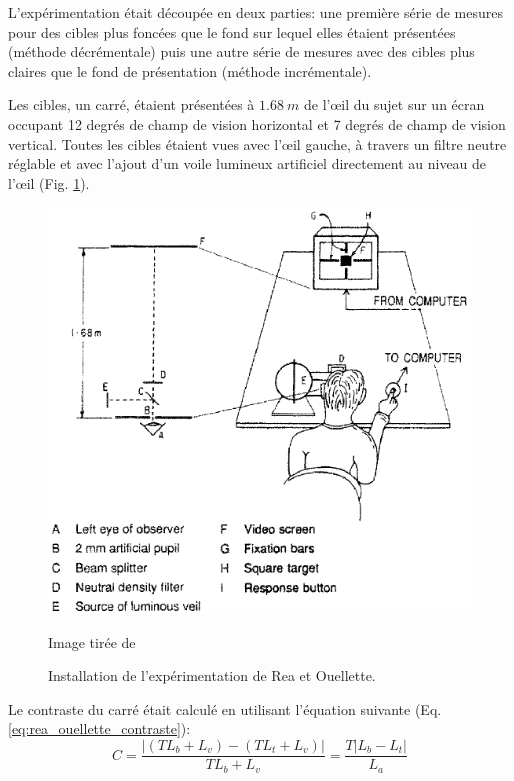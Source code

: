 	\par L'expérimentation était découpée en deux parties: une première série de mesures pour des cibles plus foncées que le fond sur lequel elles étaient présentées (méthode décrémentale) puis une autre série de mesures avec des cibles plus claires que le fond de présentation (méthode incrémentale).
	
	\par Les cibles, un carré, étaient présentées à $1.68~m$ de l'œil du sujet sur un écran occupant 12 degrés de champ de vision horizontal et 7 degrés de champ de vision vertical. Toutes les cibles étaient vues avec l'œil gauche, à travers un filtre neutre réglable et avec l'ajout d'un voile lumineux artificiel directement au niveau de l'œil (Fig. \ref{fig:rea_apparatus}).
	
	\begin{figure}[h]
		\centering
		\includegraphics[scale=.75]{Figures/ReactionTimeApparatus}
		\caption{Installation de l'expérimentation de Rea et Ouellette.}{Image tirée de \citep{rea_visual_1988}}
		\label{fig:rea_apparatus}
	\end{figure}
	
	\par Le contraste du carré était calculé en utilisant l'équation suivante (Eq. \ref{eq:rea_ouellette_contraste}):
	 \begin{equation}
		C = \frac{\vert (T L_b + L_v) - (T L_t + L_v) \vert}{T L_b + L_v} = \frac{T \vert L_b - L_t \vert}{L_a}
		\label{eq:rea_ouellette_contraste}
	\end{equation}
	

